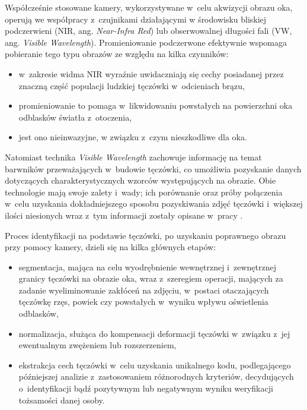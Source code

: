 Współcześnie stosowane kamery, wykorzystywane w~celu akwizycji obrazu oka, operują we współpracy z~czujnikami działającymi w środowisku bliskiej podczerwieni (NIR, ang. \emph{Near-Infra Red}) lub obserwowalnej długości fali (VW, ang. \emph{Visible Wavelength}). Promieniowanie podczerwone efektywnie wspomaga pobieranie tego typu obrazów ze względu na kilka czynników:
\begin{itemize} 
\item w~zakresie widma NIR wyraźnie uwidaczniają się cechy posiadanej przez znaczną część populacji ludzkiej tęczówki w~odcieniach brązu,
\item promieniowanie to pomaga w~likwidowaniu powstałych na powierzchni oka odblasków światła z~otoczenia,
\item jest ono nieinwazyjne, w związku z~czym nieszkodliwe dla oka.
\end{itemize}
Natomiast technika \emph{Visible Wavelength} zachowuje informację na temat barwników przeważających w~budowie tęczówki, co umożliwia pozyskanie danych dotyczących charakterystycznych wzorców występujących na obrazie. Obie technologie mają swoje zalety i~wady; ich porównanie oraz próby połączenia w~celu uzyskania dokładniejszego sposobu pozyskiwania zdjęć tęczówki i~większej ilości niesionych wraz z~tym informacji zostały opisane w~pracy \cite{Hos10}. 

Proces identyfikacji na podstawie tęczówki, po uzyskaniu poprawnego obrazu przy pomocy kamery, dzieli się na kilka głównych etapów: \begin{itemize}
\item segmentacja, mająca na celu wyodrębnienie wewnętrznej i~zewnętrznej granicy tęczówki na obrazie oka, wraz z~szeregiem operacji, mających za zadanie wyeliminowanie zakłóceń na zdjęciu, w~postaci otaczających tęczówkę rzęs, powiek czy powstałych w~wyniku wpływu oświetlenia odblasków,
\item normalizacja, służąca do kompensacji deformacji tęczówki w~związku z~jej ewentualnym zwężeniem lub rozszerzeniem,
\item ekstrakcja cech tęczówki w~celu uzyskania unikalnego kodu, podlegającego późniejszej analizie z~zastosowaniem różnorodnych kryteriów, decydujących o~identyfikacji bądź pozytywnym lub negatywnym wyniku weryfikacji tożsamości danej osoby.
\end{itemize}

